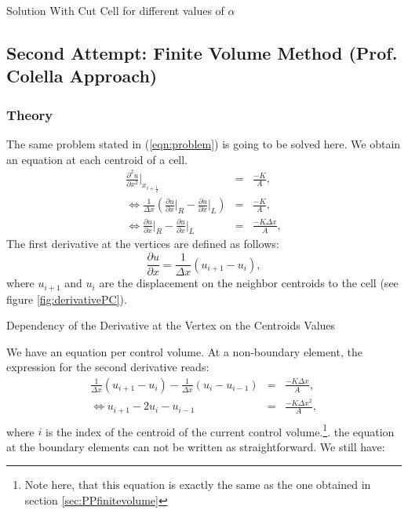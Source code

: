 \documentclass[a4paper,12pt]{article}
\makeatletter
\newenvironment{figurehere}
  {\def\@captype{figure}}
  {}
\makeatother
\begin{document}
\begin{center}
\begin{figurehere}
\caption{Solution With Cut Cell for different values of $\alpha$}\label{fig:finitevolcutPC}
\end{figurehere}
\end{center}
\subsection{Second Attempt: Finite Volume Method (Prof. Colella Approach)}\label{sec:PCCutCellTheory}
\subsubsection{Theory}
The same problem stated in (\ref{eqn:problem}) is going to be solved here. 
We obtain an equation at each centroid of a cell.
\begin{eqnarray}
\frac{\partial ^2 u}{\partial x^2}\vert_{x_{i+\frac{1}{2}}}  &=& \frac{-K}{A},\\
\Leftrightarrow \frac{1}{\Delta x}(\frac{\partial u}{\partial x}\vert_{R} -\frac{\partial u}{\partial x}\vert_{L}) &=& \frac{-K}{A},\\
\Leftrightarrow \frac{\partial u}{\partial x}\vert_{R} -\frac{\partial u}{\partial x}\vert_{L} &=&\frac{-K\Delta x}{A},
\end{eqnarray}
The first derivative at the vertices are defined as follows:
\begin{equation}\label{eqn:derivate}
\frac{\partial u}{\partial x} = \frac{1}{\Delta x}(u_{i+1} - u_{i}),
\end{equation}
where $u_{i+1}$ and $u_i$ are the displacement on the neighbor centroids to the cell (see figure \ref{fig:derivativePC}).
\begin{center}
\begin{figurehere} 

\caption{Dependency of the Derivative at the Vertex on the Centroids Values}\label{fig:derivativePC}
\end{figurehere}
\end{center}
We have an equation per control volume. At a non-boundary element, the expression for the second derivative reads:
\begin{eqnarray}
\frac{1}{\Delta x}(u_{i+1} - u_i) - \frac{1}{\Delta x}(u_{i} - u_{i-1})&=&\frac{-K\Delta x}{A},\\
\Leftrightarrow u_{i+1} - 2 u_{i} - u_{i-1}&=&\frac{-K\Delta x^2}{A},\\
\end{eqnarray}
where $i$ is the index of the centroid of the current control volume.\footnote{Note here, that this equation is exactly the same as the one obtained in section  \ref{sec:PPfinitevolume}}. the equation at the boundary elements can not be written as straightforward. We still have:
\end{document}
